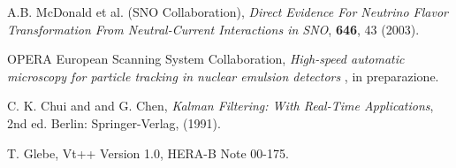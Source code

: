 \begin{thebibliography}{99}
 A.B. McDonald et al. (SNO Collaboration), {\emph{Direct Evidence For Neutrino Flavor Transformation From Neutral-Current Interactions in SNO}}, \textbf{646}, 43 (2003).


 OPERA European Scanning System Collaboration, {\emph{High-speed automatic microscopy for particle tracking in nuclear emulsion detectors }}, in preparazione.

C. K. Chui and and G. Chen, {\emph{Kalman Filtering: With Real-Time
Applications}}, 2nd ed. Berlin: Springer-Verlag, (1991).

T. Glebe, Vt++ Version 1.0, HERA-B Note 00-175.
\end{thebibliography}
